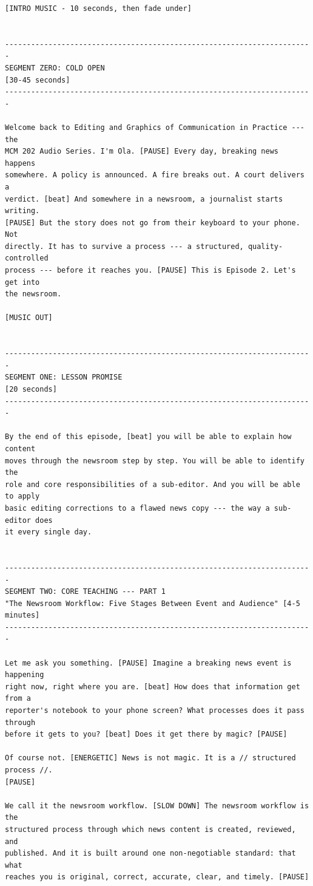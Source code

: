 {\begin{Verbatim}
[INTRO MUSIC - 10 seconds, then fade under]


-----------------------------------------------------------------------
SEGMENT ZERO: COLD OPEN
[30-45 seconds]
-----------------------------------------------------------------------

Welcome back to Editing and Graphics of Communication in Practice --- the
MCM 202 Audio Series. I'm Ola. [PAUSE] Every day, breaking news happens
somewhere. A policy is announced. A fire breaks out. A court delivers a
verdict. [beat] And somewhere in a newsroom, a journalist starts writing.
[PAUSE] But the story does not go from their keyboard to your phone. Not
directly. It has to survive a process --- a structured, quality-controlled
process --- before it reaches you. [PAUSE] This is Episode 2. Let's get into
the newsroom.

[MUSIC OUT]


-----------------------------------------------------------------------
SEGMENT ONE: LESSON PROMISE
[20 seconds]
-----------------------------------------------------------------------

By the end of this episode, [beat] you will be able to explain how content
moves through the newsroom step by step. You will be able to identify the
role and core responsibilities of a sub-editor. And you will be able to apply
basic editing corrections to a flawed news copy --- the way a sub-editor does
it every single day.


-----------------------------------------------------------------------
SEGMENT TWO: CORE TEACHING --- PART 1
"The Newsroom Workflow: Five Stages Between Event and Audience" [4-5 minutes]
-----------------------------------------------------------------------

Let me ask you something. [PAUSE] Imagine a breaking news event is happening
right now, right where you are. [beat] How does that information get from a
reporter's notebook to your phone screen? What processes does it pass through
before it gets to you? [beat] Does it get there by magic? [PAUSE]

Of course not. [ENERGETIC] News is not magic. It is a // structured process //.
[PAUSE]

We call it the newsroom workflow. [SLOW DOWN] The newsroom workflow is the
structured process through which news content is created, reviewed, and
published. And it is built around one non-negotiable standard: that what
reaches you is original, correct, accurate, clear, and timely. [PAUSE]


\end{Verbatim}}

